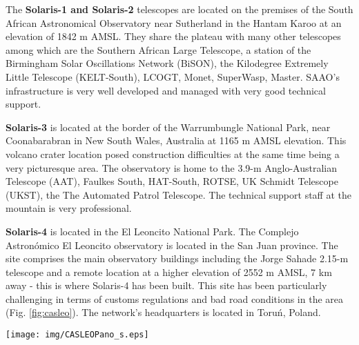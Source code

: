 The \textbf{Solaris-1 and Solaris-2} telescopes are located on the premises of the South African Astronomical Observatory near Sutherland in the Hantam Karoo at an elevation of 1842 m AMSL. They share the plateau with many other telescopes among which are the Southern African Large Telescope, a station of the Birmingham Solar Oscillations Network (BiSON), the Kilodegree Extremely Little Telescope (KELT-South), LCOGT, Monet, SuperWasp, Master. SAAO's infrastructure is very well developed and managed with very good technical support. 

\textbf{Solaris-3} is located at the border of the Warrumbungle National Park, near Coonabarabran in New South Wales, Australia at 1165 m AMSL elevation. This volcano crater location posed construction difficulties at the same time being a very picturesque area. The observatory is home to the  3.9-m Anglo-Australian Telescope (AAT), Faulkes South, HAT-South, ROTSE, UK Schmidt Telescope (UKST), the The Automated Patrol Telescope. The technical support staff at the mountain is very professional. 

\textbf{Solaris-4} is located in the El Leoncito National Park. The Complejo Astron\'omico El Leoncito observatory is located in the San Juan province. The site comprises the main observatory buildings including the Jorge Sahade 2.15-m telescope and a remote location at a higher elevation of 2552 m AMSL, 7 km away - this is where Solaris-4 has been built. This site has been particularly challenging in terms of customs regulations and bad road conditions in the area (Fig. \ref{fig:casleo}). The network's headquarters is located in Toru\'n, Poland.

\begin{figure*}[htb!]
\begin{center}
\texttt{[image: img/CASLEOPano\_s.eps]}
\caption{Solaris-4 site, CASLEO, Argentina. The site is accessible only with a proper 4x4, especially during and after rainfall. The steel cables visible on the right are guy-wires that support the lightning mast.}
\label{fig:casleo}
\end{center}
\end{figure*}
